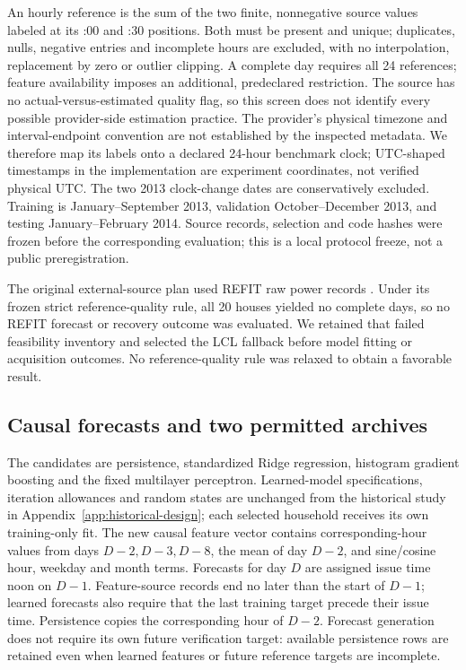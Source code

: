 \documentclass[12pt]{article}
\begin{document}
An hourly reference is the sum of the two finite, nonnegative source values
labeled at its :00 and :30 positions. Both must be present and unique;
duplicates, nulls, negative entries and incomplete hours are excluded, with
no interpolation, replacement by zero or outlier clipping. A complete day
requires all 24 references; feature availability imposes an additional,
predeclared restriction. The source has no actual-versus-estimated quality
flag, so this screen does not identify every possible provider-side
estimation practice. The provider's physical timezone and interval-endpoint
convention are not established by the inspected metadata. We therefore map
its labels onto a declared 24-hour benchmark clock; UTC-shaped timestamps in
the implementation are experiment coordinates, not verified physical UTC.
The two 2013 clock-change dates are conservatively excluded. Training is
January--September 2013, validation October--December 2013, and testing
January--February 2014. Source records, selection and code hashes were
frozen before the corresponding evaluation; this is a local protocol freeze,
not a public preregistration.

The original external-source plan used REFIT raw power records \cite{refitraw}. Under its
frozen strict reference-quality rule, all 20 houses yielded no complete
days, so no REFIT forecast or recovery outcome was evaluated. We retained
that failed feasibility inventory and selected the LCL fallback before
model fitting or acquisition outcomes. No reference-quality rule was relaxed
to obtain a favorable result.

\subsection{Causal forecasts and two permitted archives}\label{sec:external-archive}
The candidates are persistence, standardized Ridge regression, histogram
gradient boosting and the fixed multilayer perceptron. Learned-model
specifications, iteration allowances and random states are unchanged from
the historical study in Appendix~\ref{app:historical-design}; each selected
household receives its own training-only fit. The new causal feature vector
contains corresponding-hour values from days $D-2,D-3,D-8$, the mean of day
$D-2$, and sine/cosine hour, weekday and month terms. Forecasts for day $D$
are assigned issue time noon on $D-1$. Feature-source records end no later
than the start of $D-1$; learned forecasts also require that the last
training target precede their issue time. Persistence copies the
corresponding hour of $D-2$. Forecast generation does not require its own
future verification target: available persistence rows are retained even
when learned features or future reference targets are incomplete.
\end{document}
